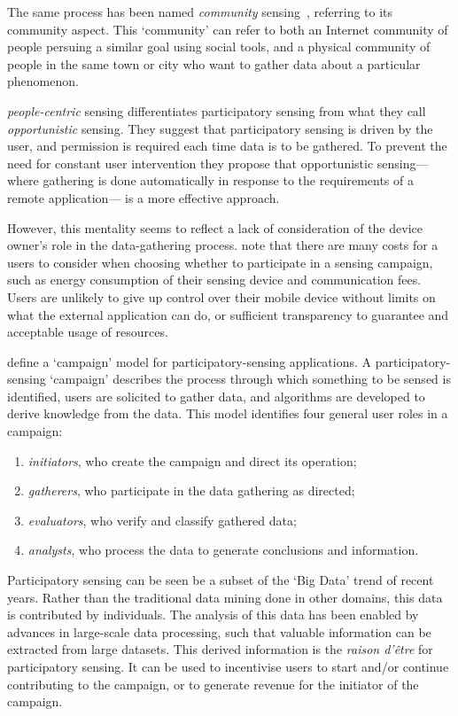 The same process has been named \emph{community} sensing~\citep{Krause2008},
referring to its community aspect. This `community' can refer to both an
Internet community of people persuing a similar goal using social tools, and a
physical community of people in the same town or city who want to gather data
about a particular phenomenon.

 \emph{people-centric} sensing differentiates
participatory sensing from what they call \emph{opportunistic} sensing. They
suggest that participatory sensing is driven by the user, and permission is
required each time data is to be gathered. To prevent the need for constant
user intervention they propose that opportunistic sensing---where gathering is
done automatically in response to the requirements of a remote application---
is a more effective approach. 

However, this mentality seems to reflect a lack of consideration of the device
owner's role in the data-gathering process. \citet{BuckinghamShum2012} note
that there are many costs for a users to consider when choosing whether to
participate in a sensing campaign, such as energy consumption of their sensing
device and communication fees. Users are unlikely to give up control over
their mobile device without limits on what the external application can do, or
sufficient transparency to guarantee and acceptable usage of resources.

\citet{Burke2006} define a `campaign' model for participatory-sensing
applications. A participatory-sensing `campaign' describes the process through
which something to be sensed is identified, users are solicited to gather
data, and algorithms are developed to derive knowledge from the data. This
model identifies four general user roles in a campaign:

\begin{enumerate}
\item \emph{initiators}, who create the campaign and direct its operation;
\item \emph{gatherers}, who participate in the data gathering as directed;
\item \emph{evaluators}, who verify and classify gathered data;
\item \emph{analysts}, who process the data to generate conclusions and information.
\end{enumerate}

Participatory sensing can be seen be a subset of the `Big Data' trend of
recent years. Rather than the traditional data mining done in other domains,
this data is contributed by individuals. The analysis of this data has been
enabled by advances in large-scale data processing, such that valuable information
can be extracted from large datasets. This derived information is the
\emph{raison d'\^{e}tre} for participatory sensing. It can be used to
incentivise users to start and/or continue contributing to the campaign, or to
generate revenue for the initiator of the campaign.

